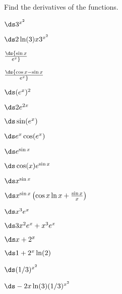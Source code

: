 \begin{enumialphparenastyle}

Find the derivatives of the functions.

\begin{ex} 
$\ds 3^{x^2}$
\begin{sol}
	$\ds 2\ln(3)x3^{x^2}$
\end{sol}
\end{ex}

\begin{ex} 
$\ds {\sin x \over e^x}$
\begin{sol}
	$\ds {\cos x-\sin x \over e^x}$
\end{sol}
\end{ex}

\begin{ex} 
$\ds (e^x)^2$
\begin{sol}
	$\ds 2e^{2x}$
\end{sol}
\end{ex}

\begin{ex} 
$\ds \sin(e^x)$
\begin{sol}
	$\ds e^x\cos(e^x)$
\end{sol}
\end{ex}

\begin{ex} 
$\ds e^{\sin x}$
\begin{sol}
	$\ds  \cos (x) e^{\sin x}$
\end{sol}
\end{ex}

\begin{ex} 
$\ds x^{\sin x}$
\begin{sol}
	$\ds x^{\sin x}\left(\cos x\ln x+{\sin x\over x}\right)$
\end{sol}
\end{ex}

\begin{ex} 
$\ds x^3e^x$
\begin{sol}
	$\ds 3x^2e^x+x^3e^x$
\end{sol}
\end{ex}

\begin{ex} 
$\ds x+2^x$
\begin{sol}
	$\ds 1+2^x\ln(2)$
\end{sol}
\end{ex}

\begin{ex} 
$\ds (1/3)^{x^2}$
\begin{sol}
	$\ds -2x\ln(3)(1/3)^{x^2}$
\end{sol}
\end{ex}


\end{enumialphparenastyle}
